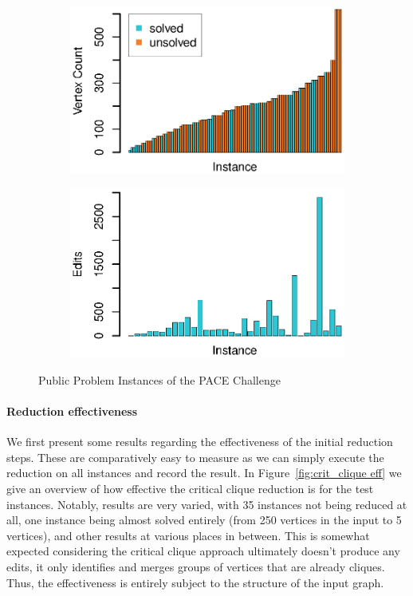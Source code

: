 \documentclass[12pt,oneside,english,parskip=full,headings=small]{scrbook}
\theoremstyle{definition}
\begin{document}
\begin{figure}[h]
	\begin{subfigure}{0.49\textwidth}
		\includegraphics[width=1.0\linewidth]{instances}
	\end{subfigure}
	\begin{subfigure}{0.49\textwidth}
		\includegraphics[width=1.0\linewidth]{solution_sizes}
	\end{subfigure}

	\caption{Public Problem Instances of the PACE Challenge}
	\label{fig:instances}
\end{figure}

\paragraph{Reduction effectiveness} We first present some results regarding the effectiveness of the
initial reduction steps. These are comparatively easy to measure as we can simply execute the
reduction on all instances and record the result. In Figure~\ref{fig:crit_clique eff} we give an
overview of how effective the critical clique reduction is for the test instances. Notably, results
are very varied, with 35 instances not being reduced at all, one instance being almost solved
entirely (from 250 vertices in the input to 5 vertices), and other results at various places in
between. This is somewhat expected considering the critical clique approach ultimately doesn't
produce any edits, it only identifies and merges groups of vertices that are already cliques. Thus,
the effectiveness is entirely subject to the structure of the input graph.
\end{document}
